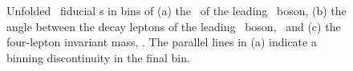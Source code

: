 \begin{figure}[htbp]
\begin{center}
\caption[Unfolded \ZZ\ fiducial \cx s.]{Unfolded \ZZ\ fiducial \cx s
in bins of (a) the
\pT\ of the leading \Z\ boson, (b) the angle between the decay leptons
of the leading \Z\ boson, \deltaPhiLL\ and (c) the four-lepton invariant mass,
\mZZ. The parallel lines in (a) indicate a binning discontinuity in the final bin.}
\label{fig:unfolded-distributions}
\end{center}
\end{figure}

